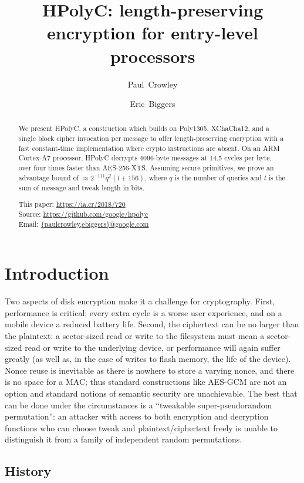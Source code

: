 \documentclass[letterpaper,luatex,11pt]{article}
\title{HPolyC: length-preserving encryption for entry-level processors}
\author{Paul~Crowley}
\author{Eric~Biggers}
\affil{Google LLC}
\begin{document}
\maketitle

\begin{abstract}
    We present HPolyC, a construction which builds on Poly1305, XChaCha12, and a
    single block cipher invocation per message to offer length-preserving
    encryption with a fast constant-time implementation where crypto
    instructions are absent.  On an ARM Cortex-A7 processor, HPolyC decrypts
    4096-byte messages at 14.5 cycles per byte, over four times faster than
    AES-256-XTS.
    Assuming secure primitives, we prove an advantage bound of
    $\approx 2^{-111}q^2(l + 156)$,
    where $q$ is the number of queries and $l$ is the sum of message and tweak length in bits.

    This paper: \url{https://ia.cr/2018/720} \\
    Source: \url{https://github.com/google/hpolyc} \\
    Email: \href{mailto:paulcrowley@google.com,ebiggers@google.com}{\{paulcrowley,ebiggers\}@google.com}
\end{abstract}

\section{Introduction}
Two aspects of disk encryption make it a challenge for cryptography.  First,
performance is critical; every extra cycle is a worse user experience, and on a mobile device
a reduced battery life.  Second, the ciphertext can be no larger than the plaintext: a sector-sized
read or write to the filesystem must mean a sector-sized read or write to the underlying device,
or performance will again suffer greatly
(as well as, in the case of writes to flash memory, the life of the device).
Nonce reuse is inevitable as there is nowhere to store a varying nonce, and there is no space
for a MAC; thus standard constructions like AES-GCM are not an option and standard notions
of semantic security are unachievable.  The best that can be done under the circumstances is
a ``tweakable super-pseudorandom permutation'': an attacker with access to both encryption
and decryption functions who can choose tweak and plaintext/ciphertext freely is unable to
distinguish it from a family of independent random permutations.

\subsection{History}
\end{document}
